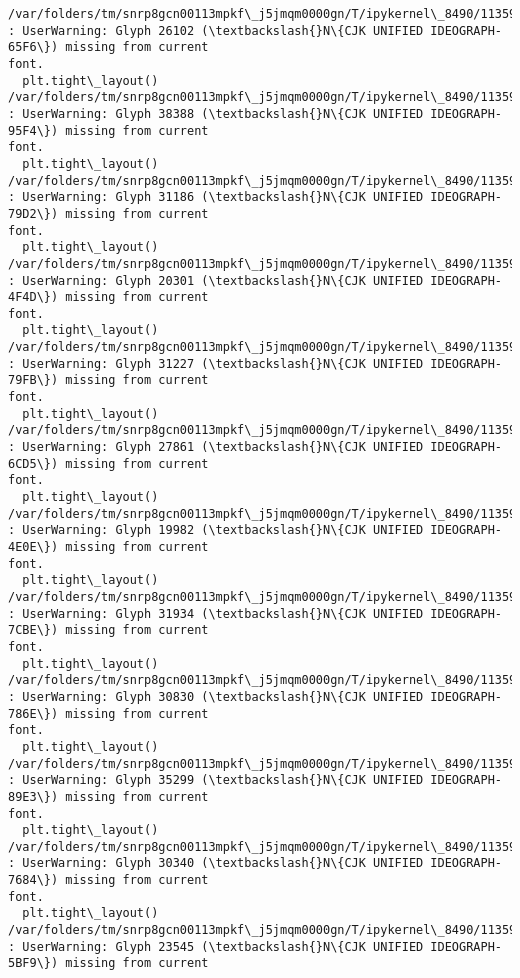 \documentclass[11pt]{article}
\begin{document}
    \begin{Verbatim}[commandchars=\\\{\}]
/var/folders/tm/snrp8gcn00113mpkf\_j5jmqm0000gn/T/ipykernel\_8490/1135938699.py:44
: UserWarning: Glyph 26102 (\textbackslash{}N\{CJK UNIFIED IDEOGRAPH-65F6\}) missing from current
font.
  plt.tight\_layout()
/var/folders/tm/snrp8gcn00113mpkf\_j5jmqm0000gn/T/ipykernel\_8490/1135938699.py:44
: UserWarning: Glyph 38388 (\textbackslash{}N\{CJK UNIFIED IDEOGRAPH-95F4\}) missing from current
font.
  plt.tight\_layout()
/var/folders/tm/snrp8gcn00113mpkf\_j5jmqm0000gn/T/ipykernel\_8490/1135938699.py:44
: UserWarning: Glyph 31186 (\textbackslash{}N\{CJK UNIFIED IDEOGRAPH-79D2\}) missing from current
font.
  plt.tight\_layout()
/var/folders/tm/snrp8gcn00113mpkf\_j5jmqm0000gn/T/ipykernel\_8490/1135938699.py:44
: UserWarning: Glyph 20301 (\textbackslash{}N\{CJK UNIFIED IDEOGRAPH-4F4D\}) missing from current
font.
  plt.tight\_layout()
/var/folders/tm/snrp8gcn00113mpkf\_j5jmqm0000gn/T/ipykernel\_8490/1135938699.py:44
: UserWarning: Glyph 31227 (\textbackslash{}N\{CJK UNIFIED IDEOGRAPH-79FB\}) missing from current
font.
  plt.tight\_layout()
/var/folders/tm/snrp8gcn00113mpkf\_j5jmqm0000gn/T/ipykernel\_8490/1135938699.py:44
: UserWarning: Glyph 27861 (\textbackslash{}N\{CJK UNIFIED IDEOGRAPH-6CD5\}) missing from current
font.
  plt.tight\_layout()
/var/folders/tm/snrp8gcn00113mpkf\_j5jmqm0000gn/T/ipykernel\_8490/1135938699.py:44
: UserWarning: Glyph 19982 (\textbackslash{}N\{CJK UNIFIED IDEOGRAPH-4E0E\}) missing from current
font.
  plt.tight\_layout()
/var/folders/tm/snrp8gcn00113mpkf\_j5jmqm0000gn/T/ipykernel\_8490/1135938699.py:44
: UserWarning: Glyph 31934 (\textbackslash{}N\{CJK UNIFIED IDEOGRAPH-7CBE\}) missing from current
font.
  plt.tight\_layout()
/var/folders/tm/snrp8gcn00113mpkf\_j5jmqm0000gn/T/ipykernel\_8490/1135938699.py:44
: UserWarning: Glyph 30830 (\textbackslash{}N\{CJK UNIFIED IDEOGRAPH-786E\}) missing from current
font.
  plt.tight\_layout()
/var/folders/tm/snrp8gcn00113mpkf\_j5jmqm0000gn/T/ipykernel\_8490/1135938699.py:44
: UserWarning: Glyph 35299 (\textbackslash{}N\{CJK UNIFIED IDEOGRAPH-89E3\}) missing from current
font.
  plt.tight\_layout()
/var/folders/tm/snrp8gcn00113mpkf\_j5jmqm0000gn/T/ipykernel\_8490/1135938699.py:44
: UserWarning: Glyph 30340 (\textbackslash{}N\{CJK UNIFIED IDEOGRAPH-7684\}) missing from current
font.
  plt.tight\_layout()
/var/folders/tm/snrp8gcn00113mpkf\_j5jmqm0000gn/T/ipykernel\_8490/1135938699.py:44
: UserWarning: Glyph 23545 (\textbackslash{}N\{CJK UNIFIED IDEOGRAPH-5BF9\}) missing from current

\end{Verbatim}
\end{document}
